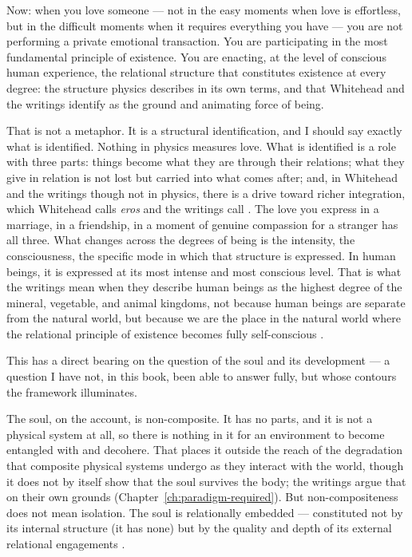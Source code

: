 Now: when you love someone --- not in the easy moments when love is effortless,
but in the difficult moments when it requires everything you have --- you are not
performing a private emotional transaction.  You are participating in the most
fundamental principle of existence.  You are enacting, at the level of conscious
human experience, the relational structure that constitutes existence at every
degree: the structure physics describes in its own terms, and that Whitehead
and the \bahai writings identify as the ground and animating force of being.

That is not a metaphor.  It is a structural identification, and I should say
exactly what is identified.  Nothing in physics measures love.  What is
identified is a role with
three parts: things become what they are through their relations; what they
give in relation is not lost but carried into what comes after; and, in
Whitehead and the \bahai writings though not in physics, there is a drive
toward richer integration, which Whitehead calls \emph{eros} and the writings
call \mahabbat.  The love you express in a marriage, in a friendship, in a
moment of genuine compassion for a stranger has all three.  What changes across the
degrees of being is the intensity, the consciousness, the specific mode in
which that structure is expressed.  In human beings, it is expressed at its
most intense and most conscious level.  That is what the \bahai writings mean
when they describe human beings as the highest degree of the mineral, vegetable,
and animal kingdoms, not because human beings are separate from the natural
world, but because we are the place in the natural world where the relational
principle of existence becomes fully self-conscious \citep{SAQ,PUP}.

This has a direct bearing on the question of the soul and its development ---
a question I have not, in this book, been able to answer fully, but whose
contours the framework illuminates.

The soul, on the \bahai account, is non-composite.  It has no parts, and it is
not a physical system at all, so there is nothing in it for an environment to
become entangled with and decohere.  That places it outside the reach of the
degradation that composite physical systems undergo as they interact with the
world, though it does not by itself show that the soul survives the body; the
writings argue that on their own grounds (Chapter~\ref{ch:paradigm-required}).
But non-compositeness does not mean isolation.  The soul is relationally embedded --- constituted not by its
internal structure (it has none) but by the quality and depth of its external
relational engagements \citep{GleaningsBahaullah,SAQ}.

